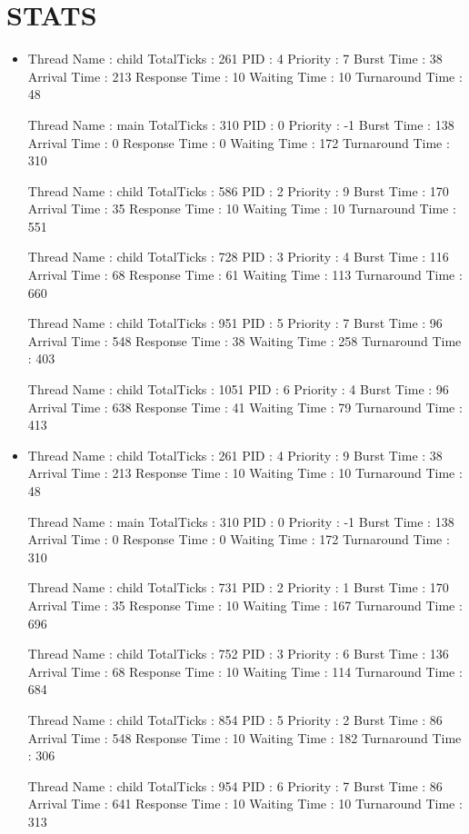 \documentclass{article}
\begin{document}
\section*{STATS}
\begin{itemize}
\item Thread Name : child
TotalTicks : 261
PID : 4
Priority : 7
Burst Time : 38
Arrival Time : 213
Response Time : 10
Waiting Time : 10
Turnaround Time : 48

Thread Name : main
TotalTicks : 310
PID : 0
Priority : -1
Burst Time : 138
Arrival Time : 0
Response Time : 0
Waiting Time : 172
Turnaround Time : 310

Thread Name : child
TotalTicks : 586
PID : 2
Priority : 9
Burst Time : 170
Arrival Time : 35
Response Time : 10
Waiting Time : 10
Turnaround Time : 551

Thread Name : child
TotalTicks : 728
PID : 3
Priority : 4
Burst Time : 116
Arrival Time : 68
Response Time : 61
Waiting Time : 113
Turnaround Time : 660

Thread Name : child
TotalTicks : 951
PID : 5
Priority : 7
Burst Time : 96
Arrival Time : 548
Response Time : 38
Waiting Time : 258
Turnaround Time : 403

Thread Name : child
TotalTicks : 1051
PID : 6
Priority : 4
Burst Time : 96
Arrival Time : 638
Response Time : 41
Waiting Time : 79
Turnaround Time : 413

\item 
Thread Name : child
TotalTicks : 261
PID : 4
Priority : 9
Burst Time : 38
Arrival Time : 213
Response Time : 10
Waiting Time : 10
Turnaround Time : 48

Thread Name : main
TotalTicks : 310
PID : 0
Priority : -1
Burst Time : 138
Arrival Time : 0
Response Time : 0
Waiting Time : 172
Turnaround Time : 310

Thread Name : child
TotalTicks : 731
PID : 2
Priority : 1
Burst Time : 170
Arrival Time : 35
Response Time : 10
Waiting Time : 167
Turnaround Time : 696

Thread Name : child
TotalTicks : 752
PID : 3
Priority : 6
Burst Time : 136
Arrival Time : 68
Response Time : 10
Waiting Time : 114
Turnaround Time : 684

Thread Name : child
TotalTicks : 854
PID : 5
Priority : 2
Burst Time : 86
Arrival Time : 548
Response Time : 10
Waiting Time : 182
Turnaround Time : 306

Thread Name : child
TotalTicks : 954
PID : 6
Priority : 7
Burst Time : 86
Arrival Time : 641
Response Time : 10
Waiting Time : 10
Turnaround Time : 313


\end{itemize}
\end{document}
